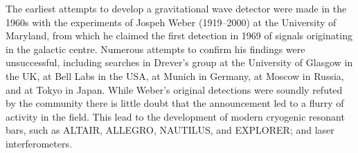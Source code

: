 The earliest attempts to develop a gravitational wave detector were
made in the 1960s with the experiments of Jospeh Weber (1919--2000) at
the University of Maryland, from which he claimed the first detection
in 1969\cite{1969PhRvL..22.1320W,1970PhRvL..24..276W} of signals
originating in the galactic centre\cite{1970PhRvL..25..180W}. Numerous
attempts to confirm his findings were unsuccessful, including searches
in Drever's group at the University of Glasgow
\cite{1973Natur.246..340D} in the UK, at Bell Labs
\cite{1973PhRvL..31..173L,1973PhRvL..31..176G,1974PhRvL..33..794L} in
the USA, at Munich\cite{1975NCimL..12..111B,1975NCimL..12..111B} in
Germany, at Moscow\cite{1973PhLA...45..271B} in Russia, and at
Tokyo\cite{1975PhRvL..35..890H} in Japan. While Weber's original
detections were soundly refuted by the community there is little doubt
that the announcement led to a flurry of activity in the field. This
lead to the development of modern cryogenic resonant bars, such as
ALTAIR\cite{1992NCimC..15..943B}, ALLEGRO\cite{2000IJMPD...9..229M},
NAUTILUS\cite{1997APh.....7..231A}, and
EXPLORER\cite{1993PhRvD..47..362A}; and laser interferometers.



